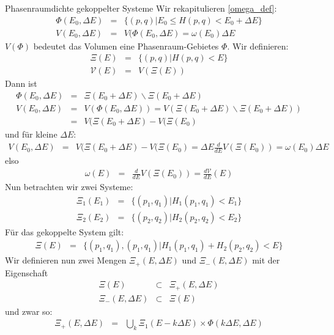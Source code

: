 \begin{chapter}{\titlestr}
\ifx\makebook\undefined
\begin{appendix}
\fi
\begin{section}{Phasenraumdichte gekoppelter Systeme}
\label{omega_fold}
Wir rekapitulieren \ref{omega_def}:
\begin{eqnarray*}
\Phi(E_0,\Delta E) &=& \{ (p,q) | E_0 \le H(p,q) < E_0+\Delta E\}\\
V(E_0,\Delta E) &=& V(\Phi(E_0,\Delta E) = \omega(E_0)\Delta E
\end{eqnarray*}
$V(\Phi)$ bedeutet das Volumen eine Phasenraum-Gebietes $\Phi$.
Wir definieren:
\begin{eqnarray*}
\Xi(E) &=& \{ (p,q) | H(p,q) < E\}\\
\mathcal{V}(E) &=& V(\Xi(E))
\end{eqnarray*}
Dann ist
\begin{eqnarray*}
\Phi(E_0,\Delta E) &=& \Xi(E_0+\Delta E)\backslash \Xi(E_0+\Delta E)\\
V(E_0,\Delta E) &=& V(\Phi(E_0,\Delta E)) = V(\Xi(E_0+\Delta E)\backslash \Xi(E_0+\Delta E))\\
&=& V(\Xi(E_0+\Delta E)-V(\Xi(E_0)
\end{eqnarray*}
und für kleine $\Delta E$:
\begin{eqnarray*}
V(E_0,\Delta E) &=& V(\Xi(E_0+\Delta E)-V(\Xi(E_0) = \Delta E\frac{d}{dE}V(\Xi(E_0)) = \omega(E_0)\Delta E
\end{eqnarray*}
elso
\begin{eqnarray*}
\omega(E) &=& \frac{d}{dE}V(\Xi(E_0)) = \frac{d\mathcal{V}}{dE}(E)
\end{eqnarray*}
Nun betrachten wir zwei Systeme:
\begin{eqnarray*}
\Xi_1(E_1) &=& \{ (p_1,q_1) | H_1(p_1,q_1) < E_1\}\\
\Xi_2(E_2) &=& \{ (p_2,q_2) | H_2(p_2,q_2) < E_2\}
\end{eqnarray*}
Für das gekoppelte System gilt:
\begin{eqnarray*}
\Xi(E) &=& \{ (p_1,q_1),(p_1,q_1) | H_1(p_1,q_1)+H_2(p_2,q_2) < E\}
\end{eqnarray*}
Wir definieren nun zwei Mengen $\Xi_+(E,\Delta E)$ und $\Xi_-(E,\Delta E)$ mit der Eigenschaft
\begin{eqnarray*}
\Xi(E) &\subset& \Xi_+(E,\Delta E)\\
\Xi_-(E,\Delta E)&\subset& \Xi(E)
\end{eqnarray*}
und zwar so:
\begin{eqnarray*}
\Xi_+(E,\Delta E) &=& \bigcup_k \Xi_1(E-k\Delta E)\times \Phi(k\Delta E,\Delta E)\\

\end{eqnarray*}
\end{section}
\end{appendix}
\end{chapter}
